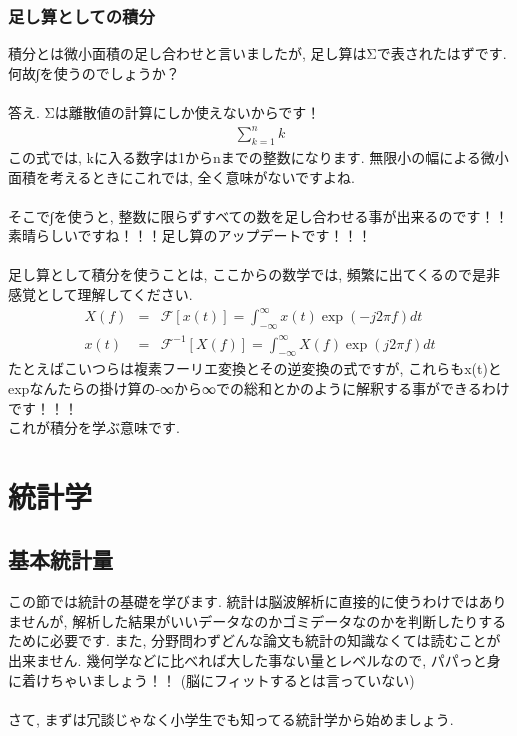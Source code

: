 \documentclass[11pt,a4paper]{jreport}
\begin{document}
\subsubsection{足し算としての積分}
積分とは微小面積の足し合わせと言いましたが, 足し算はΣで表されたはずです. 何故∫を使うのでしょうか？\\
\\
答え. Σは離散値の計算にしか使えないからです！\\
\begin{eqnarray}
\sum_{k=1}^{n} k
\end{eqnarray}
この式では, kに入る数字は1からnまでの整数になります. 無限小の幅による微小面積を考えるときにこれでは, 全く意味がないですよね.\\
\\
そこで∫を使うと, 整数に限らずすべての数を足し合わせる事が出来るのです！！\\
素晴らしいですね！！！足し算のアップデートです！！！\\
\\
足し算として積分を使うことは, ここからの数学では, 頻繁に出てくるので是非感覚として理解してください.
\begin{eqnarray}
X(f) &=& \mathcal{F}[x(t)] = \int^{\infty}_{-\infty}x(t)\exp(-j2\pi f)dt \\
 x(t) &=& \mathcal{F}^{-1}[X(f)] = \int^{\infty}_{-\infty}X(f)\exp(j2\pi f)dt 
\end{eqnarray}
たとえばこいつらは複素フーリエ変換とその逆変換の式ですが, これらもx(t)とexpなんたらの掛け算の-∞から∞での総和とかのように解釈する事ができるわけです！！！\\
これが積分を学ぶ意味です.

\section{統計学}
\subsection{基本統計量}
この節では統計の基礎を学びます. 統計は脳波解析に直接的に使うわけではありませんが, 解析した結果がいいデータなのかゴミデータなのかを判断したりするために必要です. また, 分野問わずどんな論文も統計の知識なくては読むことが出来ません. 幾何学などに比べれば大した事ない量とレベルなので, パパっと身に着けちゃいましょう！！ (脳にフィットするとは言っていない)\\
\\
さて, まずは冗談じゃなく小学生でも知ってる統計学から始めましょう.\\
\end{document}
